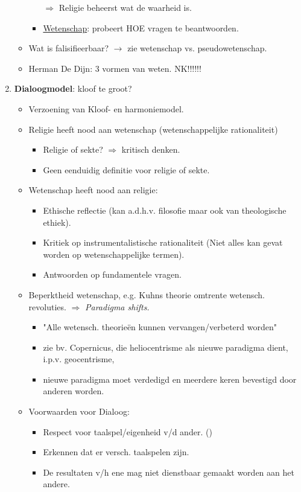 \begin{enumerate}
\begin{itemize}
\begin{itemize}
			\item[$\Rightarrow$] Religie beheerst wat de waarheid is.
			\item \underline{Wetenschap}: probeert HOE vragen te beantwoorden.
		\end{itemize}
		\item Wat is falisifieerbaar? $\rightarrow$ zie wetenschap vs. pseudowetenschap.
		\item Herman De Dijn: 3 vormen van weten. NK!!!!!!
	\end{itemize}
	\item \textbf{Dialoogmodel}: kloof te groot?
	\begin{itemize}
		\item Verzoening van Kloof- en harmoniemodel.
		\item Religie heeft nood aan wetenschap (wetenschappelijke rationaliteit)
		\begin{itemize}
			\item Religie of sekte? $\Rightarrow$ kritisch denken.
			\item Geen eenduidig definitie voor religie of sekte.
		\end{itemize}
		\item Wetenschap heeft nood aan religie:
		\begin{itemize}
			\item Ethische reflectie (kan a.d.h.v. filosofie maar ook van theologische ethiek).
			\item Kritiek op instrumentalistische rationaliteit (Niet alles kan gevat worden op wetenschappelijke termen).
			\item Antwoorden op fundamentele vragen.
		\end{itemize}
		\item Beperktheid wetenschap, e.g. Kuhns theorie omtrente wetensch. revoluties. $\Rightarrow$ \textit{Paradigma shifts.}
		\begin{itemize}
			\item "Alle wetensch. theorie\"en kunnen vervangen/verbeterd worden"
			\item zie bv. Copernicus, die heliocentrisme als nieuwe paradigma dient, i.p.v. geocentrisme,
			\item  nieuwe paradigma moet verdedigd en meerdere keren bevestigd door anderen worden.
		\end{itemize}
		\item Voorwaarden voor Dialoog:
		\begin{itemize}
			\item Respect voor taalspel/eigenheid v/d ander. ()
			\item Erkennen dat er versch. taalspelen zijn.
			\item De resultaten v/h ene mag niet dienstbaar gemaakt worden aan het andere.
		\end{itemize}
	\end{itemize}
\end{enumerate}